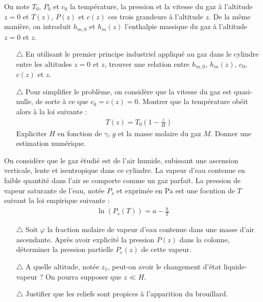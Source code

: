 \documentclass{report}
\begin{document}
On note $T_0$, $P_0$ et $c_0$ la température, la pression et la vitesse du gaz à l'altitude $z=0$ et $T(z)$, $P(z)$ et $c(z)$ ces trois grandeurs à l'altitude $z$. De la même manière, on introduit $h_{m,0}$ et $h_m(z)$ l'enthalpie massique du gaz à l'altitude $z=0$ et $z$.

\begin{itemize}
	
	\item[$\triangle$] En utilisant le premier principe industriel appliqué au gaz dans le cylindre entre les altitudes $z=0$ et $z$, trouver une relation entre $h_{m,0}$, $h_m(z)$, $c_0$, $c(z)$ et $z$.
	
	\item[$\triangle$] Pour simplifier le problème, on considère que la vitesse du gaz est quasi-nulle, de sorte à ce que $c_0=c(z)=0$. Montrer que la température obéit alors à la loi suivante :
	\begin{align*}
		T(z)=T_0\left( 1-\frac{z}{H}\right) 
	\end{align*}
	Expliciter $H$ en fonction de $\gamma$, $g$ et la masse molaire du gaz $M$. Donner une estimation numérique.
	
\end{itemize}

On considère que le gaz étudié est de l'air humide, subissant une ascension verticale, lente et isentropique dans ce cylindre. La vapeur d'eau contenue en faible quantité dans l'air se comporte comme un gaz parfait. La pression de vapeur saturante de l'eau, notée $P_s$ et exprimée en Pa est une focntion de $T$ suivant la loi empirique suivante :
\begin{align*}
	\ln(P_s(T)) = a -\frac{b}{T}
\end{align*}

\begin{itemize}
	
	\item[$\triangle$] Soit $\varphi$ la fraction molaire de vapeur d'eau contenue dans une masse d'air ascendante. Après avoir explicité la pression $P(z)$ dans la colonne, déterminer la pression partielle $P_e(z)$ de cette vapeur. 
	
	\item[$\triangle$] A quelle altitude, notée $z_1$, peut-on avoir le changement d'état liquide-vapeur ? On pourra supposer que $z\ll H$.
	
	\item[$\triangle$] Justifier que les reliefs sont propices à l'apparition du brouillard.
	
\end{itemize}
\end{document}
